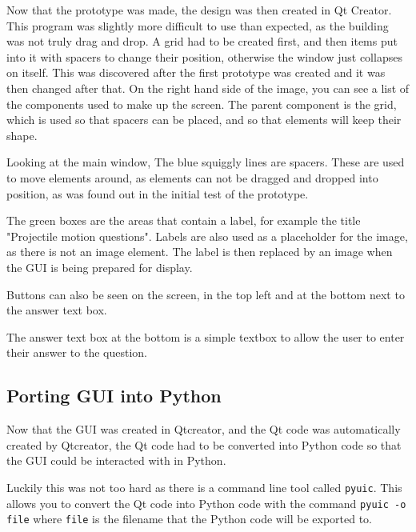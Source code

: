 Now that the prototype was made, the design was then created in Qt Creator. This program was slightly more difficult to use than expected, as the building was not truly drag and drop. A grid had to be created first, and then items put into it with spacers to change their position, otherwise the window just collapses on itself. This was discovered after the first prototype was created and it was then changed after that.
On the right hand side of the image, you can see a list of the components used to make up the screen. The parent component is the grid, which is used so that spacers can be placed, and so that elements will keep their shape. 

Looking at the main window, The blue squiggly lines are spacers. These are used to move elements around, as elements can not be dragged and dropped into position, as was found out in the initial test of the prototype.

The green boxes are the areas that contain a label, for example the title "Projectile motion questions". Labels are also used as a placeholder for the image, as there is not an image element. The label is then replaced by an image when the GUI is being prepared for display.

Buttons can also be seen on the screen, in the top left and at the bottom next to the answer text box. 

The answer text box at the bottom is a simple textbox to allow the user to enter their answer to the question.

\subsection{Porting GUI into Python}
Now that the GUI was created in Qtcreator, and the Qt code was automatically created by Qtcreator, the Qt code had to be converted into Python code so that the GUI could be interacted with in Python. 

Luckily this was not too hard as there is a command line tool called \texttt{pyuic}. This allows you to convert the Qt code into Python code with the command \texttt{pyuic -o file} where \texttt{file} is the filename that the Python code will be exported to. 

